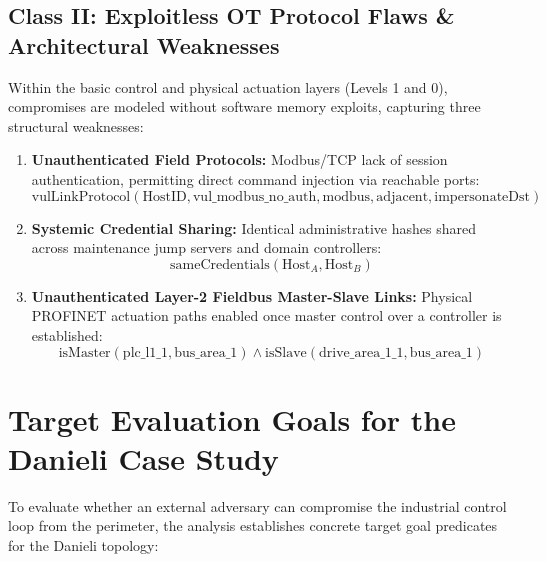 \documentclass[target=mst,aauheader=aics,style=]{thud}
\begin{document}
\subsection{Class II: Exploitless OT Protocol Flaws \& Architectural Weaknesses}
Within the basic control and physical actuation layers (Levels 1 and 0), compromises are modeled without software memory exploits, capturing three structural weaknesses:
\begin{enumerate}
    \item \textbf{Unauthenticated Field Protocols:} Modbus/TCP lack of session authentication, permitting direct command injection via reachable ports:
    $$\text{vulLinkProtocol}(\text{HostID}, \text{vul\_modbus\_no\_auth}, \text{modbus}, \text{adjacent}, \text{impersonateDst})$$
    \item \textbf{Systemic Credential Sharing:} Identical administrative hashes shared across maintenance jump servers and domain controllers:
    $$\text{sameCredentials}(\text{Host}_A, \text{Host}_B)$$
    \item \textbf{Unauthenticated Layer-2 Fieldbus Master-Slave Links:} Physical PROFINET actuation paths enabled once master control over a controller is established:
    $$\text{isMaster}(\text{plc\_l1\_1}, \text{bus\_area\_1}) \land \text{isSlave}(\text{drive\_area\_1\_1}, \text{bus\_area\_1})$$
\end{enumerate}

\section{Target Evaluation Goals for the Danieli Case Study}
To evaluate whether an external adversary can compromise the industrial control loop from the perimeter, the analysis establishes concrete target goal predicates for the Danieli topology:
\end{document}
